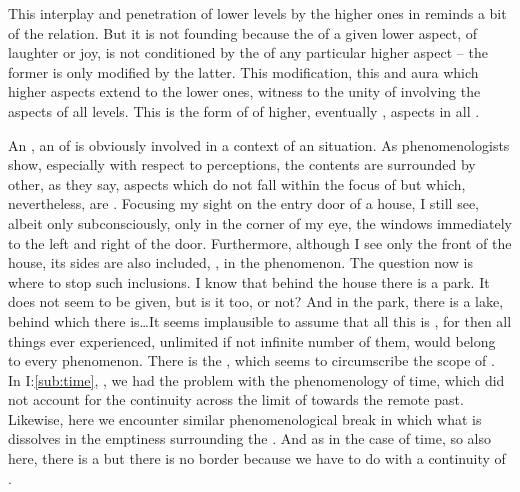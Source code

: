 \label{notfounding}
This interplay and penetration of lower levels by the higher ones in  reminds a bit of the  relation.  But it is
not founding because the  of a given lower aspect, of laughter or
joy, is not conditioned by the  of any particular higher aspect --
the former is only modified by the latter.  This modification, this
 and aura which higher aspects extend to the lower
ones, witness to the unity of  involving the aspects of
all levels.  This is the form of  of higher, eventually
, aspects in all .

\pa
An , an  of  is 
obviously involved in a context of an  situation.  As
phenomenologists show, especially with respect to perceptions, the
 contents are surrounded by other, as they say,
 aspects which do not fall within the focus of
 but which, nevertheless, are . 
Focusing my sight on the entry door of a house, I still see, albeit
only subconsciously, only in the corner of my eye, the windows immediately to
the left and right of the door.  Furthermore, although I see only the
front of the house, its sides are also included, , in
the  phenomenon.  The question now is where to stop such
inclusions.  I know that behind the house there is a park.  It does
not seem to be given, but is it  too, or not?  And in
the park, there is a lake, behind which there is\ldots  It seems
implausible to assume that all this is , for then all
things ever experienced, unlimited if not infinite number of them, 
would belong to every phenomenon. There is the \hoa, which seems to circumscribe
the scope of . In I:\ref{sub:time}, 
, we had the problem with the  
phenomenology of time, which did not account for the continuity across the limit
of  towards the remote past. Likewise, here we encounter similar
phenomenological break in which what is  dissolves in the emptiness
surrounding the \hoa. And as in the case of time, so also here, there is a
 but there is no
border because we have to do with a continuity of . 

